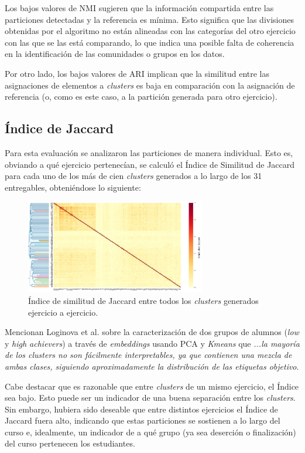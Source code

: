 \documentclass[11pt,a4paper,twoside,openany]{tesis}
\begin{document}
Los bajos valores de NMI sugieren que la información compartida entre las particiones detectadas y la referencia es mínima. Esto significa que las divisiones obtenidas por el algoritmo no están alineadas con las categorías del otro ejercicio con las que se las está comparando, lo que indica una posible falta de coherencia en la identificación de las comunidades o grupos en los datos.

Por otro lado, los bajos valores de ARI implican que la similitud entre las asignaciones de elementos a \emph{clusters} es baja en comparación con la asignación de referencia (o, como es este caso, a la partición generada para otro ejercicio).

\subsection{Índice de Jaccard}
Para esta evaluación se analizaron las particiones de manera individual. Esto es, obviando a qué ejercicio pertenecían, se calculó el Índice de Similitud de Jaccard \cite{jaccard} para cada uno de los más de cien \emph{clusters} generados a lo largo de los 31 entregables, obteniéndose lo siguiente:

\begin{figure}[H]
    \centering
    \includegraphics[width=0.7\textwidth]{imagenes/clusterxcluster.png}
    \caption{Índice de similitud de Jaccard entre todos los \emph{clusters} generados ejercicio a ejercicio.}
\end{figure}


Mencionan Loginova et al. sobre la caracterización de dos grupos de alumnos (\emph{low} y \emph{high achievers}) a través de \emph{embeddings} usando PCA y \emph{Kmeans} que \emph{...la mayoría de los clusters no son fácilmente interpretables, ya que contienen una mezcla de ambas clases, siguiendo aproximadamente la distribución de las etiquetas objetivo}\cite{loginova2021embedding}.


Cabe destacar que es razonable que entre \emph{clusters} de un mismo ejercicio, el Índice sea bajo. Esto puede ser un indicador de una buena separación entre los \emph{clusters}. Sin embargo, hubiera sido deseable que entre distintos ejercicios el Índice de Jaccard fuera alto, indicando que estas particiones se sostienen a lo largo del curso e, idealmente, un indicador de a qué grupo (ya sea deserción o finalización) del curso pertenecen los estudiantes. 
\end{document}
